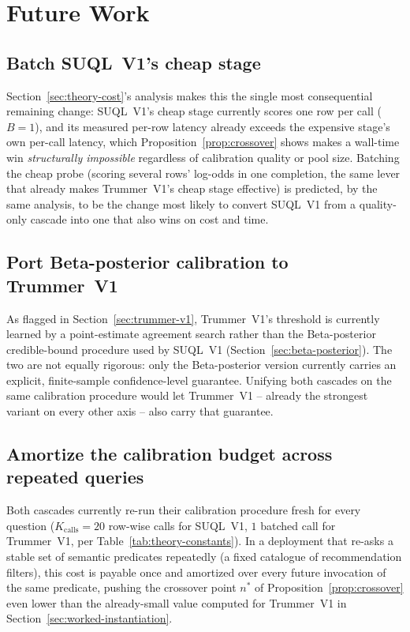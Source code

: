 \section{Future Work}

\subsection{Batch SUQL~V1's cheap stage}
\label{sec:future-suql-v1}
Section~\ref{sec:theory-cost}'s analysis makes this the single most
consequential remaining change: SUQL~V1's cheap stage currently scores
one row per call ($B=1$), and its measured per-row latency already
exceeds the expensive stage's own per-call latency, which
Proposition~\ref{prop:crossover} shows makes a wall-time win
\emph{structurally impossible} regardless of calibration quality or
pool size. Batching the cheap probe (scoring several rows' log-odds in
one completion, the same lever that already makes Trummer~V1's cheap
stage effective) is predicted, by the same analysis, to be the change
most likely to convert SUQL~V1 from a quality-only cascade into one that
also wins on cost and time.

\subsection{Port Beta-posterior calibration to Trummer~V1}
As flagged in Section~\ref{sec:trummer-v1}, Trummer~V1's threshold is
currently learned by a point-estimate agreement search rather than the
Beta-posterior credible-bound procedure used by SUQL~V1
(Section~\ref{sec:beta-posterior}). The two are not equally rigorous:
only the Beta-posterior version currently carries an explicit,
finite-sample confidence-level guarantee. Unifying both cascades on the
same calibration procedure would let Trummer~V1 -- already the strongest
variant on every other axis -- also carry that guarantee.

\subsection{Amortize the calibration budget across repeated queries}
Both cascades currently re-run their calibration procedure fresh for
every question ($K_{\mathrm{calls}}=20$ row-wise calls for SUQL~V1,
$1$ batched call for Trummer~V1, per Table~\ref{tab:theory-constants}).
In a deployment that re-asks a stable set of semantic predicates
repeatedly (\eg a fixed catalogue of recommendation filters), this cost
is payable once and amortized over every future invocation of the same
predicate, pushing the crossover point $n^\ast$ of
Proposition~\ref{prop:crossover} even lower than the already-small value
computed for Trummer~V1 in Section~\ref{sec:worked-instantiation}.

